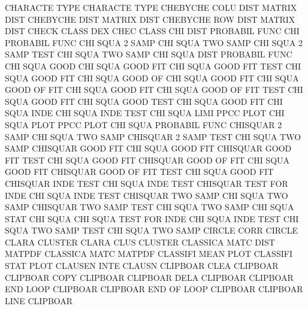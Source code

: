 CHARACTE TYPE                           CHARACTE TYPE
CHEBYCHE COLU DIST                      MATRIX   DIST
CHEBYCHE DIST                           MATRIX   DIST
CHEBYCHE ROW  DIST                      MATRIX   DIST
CHECK    CLASS                          DEX      CHEC CLASS
CHI      DIST                           PROBABIL FUNC
CHI                                     PROBABIL FUNC
CHI      SQUA 2    SAMP                 CHI      SQUA TWO  SAMP
CHI      SQUA 2    SAMP TEST            CHI      SQUA TWO  SAMP
CHI      SQUA DIST                      PROBABIL FUNC
CHI      SQUA GOOD                      CHI      SQUA GOOD FIT
CHI      SQUA GOOD FIT  TEST            CHI      SQUA GOOD FIT
CHI      SQUA GOOD OF                   CHI      SQUA GOOD FIT
CHI      SQUA GOOD OF   FIT             CHI      SQUA GOOD FIT
CHI      SQUA GOOD OF   FIT  TEST       CHI      SQUA GOOD FIT
CHI      SQUA GOOD TEST                 CHI      SQUA GOOD FIT
CHI      SQUA INDE                      CHI      SQUA INDE TEST
CHI      SQUA LIMI                      PPCC     PLOT
CHI      SQUA PLOT                      PPCC     PLOT
CHI      SQUA                           PROBABIL FUNC
CHISQUAR 2    SAMP                      CHI      SQUA TWO  SAMP
CHISQUAR 2    SAMP TEST                 CHI      SQUA TWO  SAMP
CHISQUAR GOOD FIT                       CHI      SQUA GOOD FIT
CHISQUAR GOOD FIT  TEST                 CHI      SQUA GOOD FIT
CHISQUAR GOOD OF   FIT                  CHI      SQUA GOOD FIT
CHISQUAR GOOD OF   FIT  TEST            CHI      SQUA GOOD FIT
CHISQUAR INDE TEST                      CHI      SQUA INDE TEST
CHISQUAR TEST FOR  INDE                 CHI      SQUA INDE TEST
CHISQUAR TWO  SAMP                      CHI      SQUA TWO  SAMP
CHISQUAR TWO  SAMP TEST                 CHI      SQUA TWO  SAMP
CHI      SQUA STAT                      CHI      SQUA
CHI      SQUA TEST FOR  INDE            CHI      SQUA INDE TEST
CHI      SQUA TWO  SAMP TEST            CHI      SQUA TWO  SAMP
CIRCLE   CORR                           CIRCLE
CLARA                                   CLUSTER
CLARA    CLUS                           CLUSTER
CLASSICA MATC DIST                      MATPDF
CLASSICA MATC                           MATPDF
CLASSIFI MEAN PLOT                      CLASSIFI STAT PLOT
CLAUSEN  INTE                           CLAUSN
CLIPBOAR CLEA                           CLIPBOAR
CLIPBOAR COPY                           CLIPBOAR
CLIPBOAR DELA                           CLIPBOAR
CLIPBOAR END  LOOP                      CLIPBOAR
CLIPBOAR END  OF   LOOP                 CLIPBOAR
CLIPBOAR LINE                           CLIPBOAR
